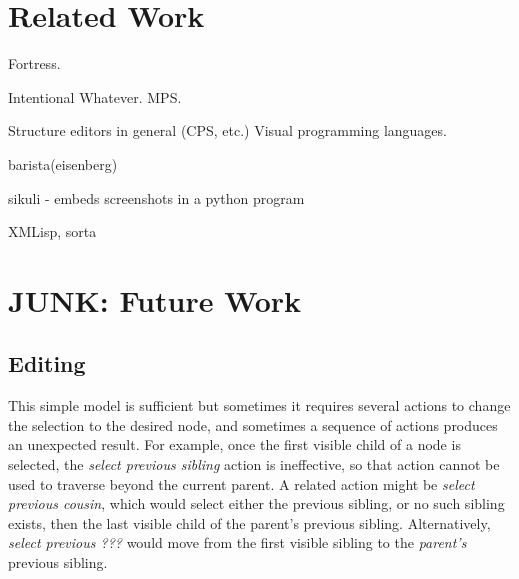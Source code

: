 \section{Related Work}\todo{}

Fortress. 

Intentional Whatever. MPS. 

Structure editors in general (CPS, etc.) Visual programming languages. 

barista(eisenberg)

sikuli - embeds screenshots in a python program

XMLisp, sorta




\section{JUNK: Future Work}







\subsection{Editing}




 This simple model is sufficient but sometimes it requires several actions to change the selection to the desired node, and sometimes a sequence of actions produces an unexpected result. For example, once the first visible child of a node is selected, the \emph{select previous sibling} action is ineffective, so that action cannot be used to traverse beyond the current parent. A related action might be \emph{select previous cousin}, which would select either the previous sibling, or no such sibling exists, then the last visible child of the parent's previous sibling. Alternatively, \emph{select previous ???} would move from the first visible sibling to the \emph{parent's} previous sibling.


